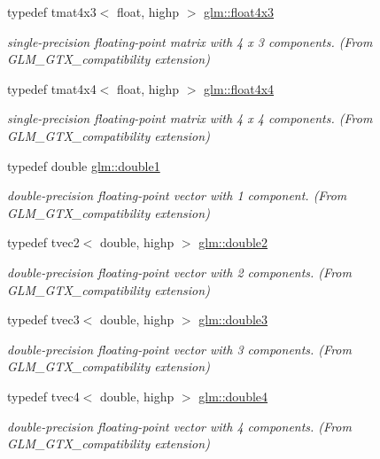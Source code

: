 \begin{DoxyCompactItemize}
typedef tmat4x3$<$ float, highp $>$ \hyperlink{group__gtx__compatibility_gaa0c1ca31e5e064223cc7cfc0344ac787}{glm\+::float4x3}
\begin{DoxyCompactList}\small\item\em single-\/precision floating-\/point matrix with 4 x 3 components. (From G\+L\+M\+\_\+\+G\+T\+X\+\_\+compatibility extension) \end{DoxyCompactList}\item 
typedef tmat4x4$<$ float, highp $>$ \hyperlink{group__gtx__compatibility_ga67688a2f2fc6386544d1a47a5d430467}{glm\+::float4x4}
\begin{DoxyCompactList}\small\item\em single-\/precision floating-\/point matrix with 4 x 4 components. (From G\+L\+M\+\_\+\+G\+T\+X\+\_\+compatibility extension) \end{DoxyCompactList}\item 
typedef double \hyperlink{group__gtx__compatibility_gab8b88350212cea916857cb2f49b8a29f}{glm\+::double1}
\begin{DoxyCompactList}\small\item\em double-\/precision floating-\/point vector with 1 component. (From G\+L\+M\+\_\+\+G\+T\+X\+\_\+compatibility extension) \end{DoxyCompactList}\item 
typedef tvec2$<$ double, highp $>$ \hyperlink{group__gtx__compatibility_ga490652005dad57a41887b974195f36c1}{glm\+::double2}
\begin{DoxyCompactList}\small\item\em double-\/precision floating-\/point vector with 2 components. (From G\+L\+M\+\_\+\+G\+T\+X\+\_\+compatibility extension) \end{DoxyCompactList}\item 
typedef tvec3$<$ double, highp $>$ \hyperlink{group__gtx__compatibility_ga80c4961ce61e918f21c1546d43aea2f0}{glm\+::double3}
\begin{DoxyCompactList}\small\item\em double-\/precision floating-\/point vector with 3 components. (From G\+L\+M\+\_\+\+G\+T\+X\+\_\+compatibility extension) \end{DoxyCompactList}\item 
typedef tvec4$<$ double, highp $>$ \hyperlink{group__gtx__compatibility_ga43d433fc74b24a45801e2be74e7f6fca}{glm\+::double4}
\begin{DoxyCompactList}\small\item\em double-\/precision floating-\/point vector with 4 components. (From G\+L\+M\+\_\+\+G\+T\+X\+\_\+compatibility extension) \end{DoxyCompactList}\item 

\end{DoxyCompactItemize}
